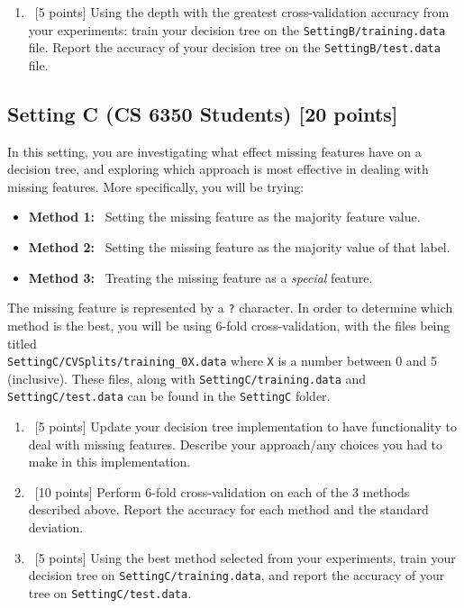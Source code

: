 \begin{enumerate}
\begin{enumerate}
  \item ~[5 points]  Using the depth with the greatest cross-validation accuracy from your experiments: train your decision tree on the \texttt{SettingB/training.data} file. Report the accuracy of your decision tree on the \texttt{SettingB/test.data} file. 	
  \end{enumerate}
  
\end{enumerate}

\subsection*{Setting C (CS 6350 Students) [20 points]}

In this setting, you are investigating what effect missing features have on a decision tree, and exploring which approach is most effective in dealing with missing features. More specifically, you will be trying:
\begin{itemize}
\item \textbf{Method 1:} ~Setting the missing feature as the majority feature value.
\item \textbf{Method 2:} ~Setting the missing feature as the majority value of that label. 
\item \textbf{Method 3:} ~Treating the missing feature as a \textit{special} feature.
\end{itemize}
The missing feature is represented by a \texttt{?} character. In order to determine which method is the best, you will be using 6-fold cross-validation, with the files being titled\\ \texttt{SettingC/CVSplits/training\_0X.data} where \texttt{X} is a number between 0 and 5 (inclusive). These files, along with \texttt{SettingC/training.data} and \texttt{SettingC/test.data} can be found in the \texttt{SettingC} folder. 

\begin{enumerate}

  
\item ~[5 points] Update your decision tree implementation to have functionality to deal with missing features. Describe your approach/any choices you had to make in this implementation. 
  
\item ~[10 points] Perform 6-fold cross-validation on each of the 3 methods described above. Report the accuracy for each method and the standard deviation. 
  
\item ~[5 points] Using the best method selected from your experiments, train your decision tree on \texttt{SettingC/training.data}, and report the accuracy of your tree on \texttt{SettingC/test.data}. 
\end{enumerate}





